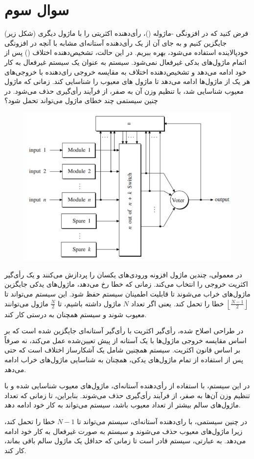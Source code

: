 \section{سوال سوم}


فرض کنید که در افزونگی -ماژوله ()، رأی‌دهنده اکثریتی را با  ماژول دیگری (شکل زیر) جایگزین کنیم و به جای آن از یک رأی‌دهنده آستانه‌ای  مشابه با آنچه در افزونگی خودپالاینده  استفاده می‌شود، بهره ببریم. در این حالت، تشخیص‌دهنده اختلاف () پس از اتمام ماژول‌های بدکی غیرفعال نمی‌شود. سیستم به عنوان یک سیستم  غیرفعال به کار خود ادامه می‌دهد و تشخیص‌دهنده اختلاف به مقایسه خروجی رای‌دهنده با خروجی‌های هر یک از ماژول‌ها ادامه می‌دهد تا ماژول های معیوب را شناسایی کند. زمانی که ماژول معیوب شناسایی شد، با تنظیم وزن آن به صفر، از فرآیند رأی‌گیری حذف می‌شود. در چنین سیستمی چند خطای ماژول می‌تواند تحمل شود؟


\begin{figure}[h]
    \centering
    \includegraphics*[width=0.6\linewidth]{pics/img1.png}
\end{figure}


\begin{qsolve}
	
	
	
	
	در  معمولی، چندین ماژول افزونه ورودی‌های یکسان را پردازش می‌کنند و یک رأی‌گیر اکثریت خروجی را انتخاب می‌کند. زمانی که خطا رخ می‌دهد، ماژول‌های یدکی جایگزین ماژول‌های خراب می‌شوند تا قابلیت اطمینان سیستم حفظ شود. این سیستم‌ می‌تواند تا $\left\lfloor \frac{N-1}{2} \right\rfloor$ خطا را تحمل کند. یعنی اگر تعداد $N$ ماژول داشته باشیم، تا $\frac{N}{2}$ ماژول می‌توانند معیوب شوند و سیستم همچنان به درستی کار کند.
	
	
	در طراحی اصلاح شده، رأی‌گیر اکثریت با رأی‌گیر آستانه‌ای جایگزین شده است که بر اساس مقایسه خروجی ماژول‌ها با یک آستانه از پیش تعیین‌شده عمل می‌کند، نه صرفاً بر اساس قانون اکثریت. سیستم همچنین شامل یک آشکارساز اختلاف است که حتی پس از استفاده از تمام ماژول‌های یدکی، همچنان به شناسایی ماژول‌های خراب ادامه می‌دهد.
	
	در این سیستم، با استفاده از رأی‌دهنده آستانه‌ای، ماژول‌های معیوب شناسایی شده و با تنظیم وزن آن‌ها به صفر، از فرآیند رأی‌گیری حذف می‌شوند. بنابراین، تا زمانی که تعداد ماژول‌های سالم بیشتر از تعداد معیوب باشد، سیستم می‌تواند به کار خود ادامه دهد.
	
	در چنین سیستمی، با رای‌دهنده آستانه‌ای، سیستم می‌تواند تا $N-1$ خطا را تحمل کند، زیرا ماژول‌های معیوب حذف می‌شوند و سیستم به صورت غیرفعال به کار خود ادامه می‌دهد. به عبارتی، سیستم قادر است تا زمانی که حداقل یک ماژول سالم باقی بماند، کار کند.
	
	
\end{qsolve}